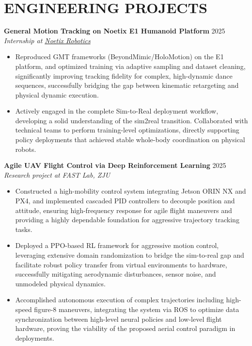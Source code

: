 \documentclass[a4paper,11pt]{article}
\begin{document}
\section{ENGINEERING PROJECTS}

\textbf{General Motion Tracking on Noetix E1 Humanoid Platform} \hfill 2025 \\
\textit{Internship at \href{https://noetixrobotics.com/en}{Noetix Robotics}}
\begin{itemize}[nosep,after=\strut, leftmargin=1.5em, itemsep=3pt,label=$\bullet$]
\item Reproduced GMT frameworks (BeyondMimic/HoloMotion) on the E1 platform, and optimized training via adaptive sampling and dataset cleaning, significantly improving tracking fidelity for complex, high-dynamic dance sequences, successfully bridging the gap between kinematic retargeting and physical dynamic execution.
\item Actively engaged in the complete Sim-to-Real deployment workflow, developing a solid understanding of the sim2real transition. Collaborated with technical teams to perform training-level optimizations, directly supporting policy deployments that achieved stable whole-body coordination on physical robots.
\end{itemize}

\vspace{6pt}

\textbf{Agile UAV Flight Control via Deep Reinforcement Learning} \hfill 2025 \\
\textit{Research project at FAST Lab, ZJU}
\begin{itemize}[nosep,after=\strut, leftmargin=1.5em, itemsep=3pt,label=$\bullet$]
\item Constructed a high-mobility control system integrating Jetson ORIN NX and PX4, and implemented cascaded PID controllers to decouple position and attitude, ensuring high-frequency response for agile flight maneuvers and providing a highly dependable foundation for aggressive trajectory tracking tasks.
\item Deployed a PPO-based RL framework for aggressive motion control, leveraging extensive domain randomization to bridge the sim-to-real gap and facilitate robust policy transfer from virtual environments to hardware, successfully mitigating aerodynamic disturbances, sensor noise, and unmodeled physical dynamics.
\item Accomplished autonomous execution of complex trajectories including high-speed figure-8 maneuvers, integrating the system via ROS to optimize data synchronization between high-level neural policies and low-level flight hardware, proving the viability of the proposed aerial control paradigm in deployments.
\end{itemize}
\end{document}
